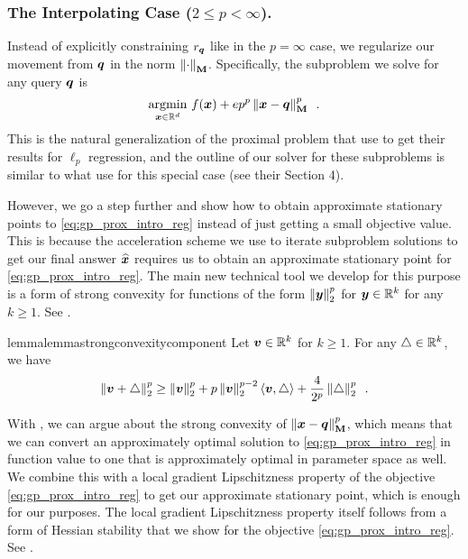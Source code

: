 \subsubsection{The Interpolating Case (\texorpdfstring{$2 \le p < \infty$}{2 <= p < infinity}).}

Instead of explicitly constraining $r_{\bm{q}}$ like in the $p=\infty$ case, we regularize our movement from $\bm{q}$ in the norm $\left\lVert \cdot \right\rVert_{\mathbf{M}}$. Specifically, the subproblem we solve for any query $\bm{q}$ is
\begin{align}
    \underset{\bm{x}\in\mathbb{R}^d}{\mathrm{argmin}}\  f(\bm{x}) + ep^p\left\lVert \bm{x}-\bm{q} \right\rVert_{\mathbf{M}}^p\enspace.\label{eq:gp_prox_intro_reg}
\end{align}
This is the natural generalization of the proximal problem that \cite{jls21} use to get their results for $\ell_p$ regression, and the outline of our solver for these subproblems is similar to what \cite{jls21} use for this special case (see their Section 4).

However, we go a step further and show how to obtain approximate stationary points to \eqref{eq:gp_prox_intro_reg} instead of just getting a small objective value. This is because the acceleration scheme we use to iterate subproblem solutions to get our final answer $\widehat{\bm{x}}$ requires us to obtain an approximate stationary point for \eqref{eq:gp_prox_intro_reg}. The main new technical tool we develop for this purpose is a form of strong convexity for functions of the form $\left\lVert \bm{y} \right\rVert_2^p$ for $\bm{y}\in\mathbb{R}^k$ for any $k\ge 1$. See .

\begin{restatable*}{lemma}{lemmastrongconvexitycomponent}
\label{lemma:strong_convexity_component}
Let $\bm{v} \in \mathbb{R}^k$ for $k\ge 1$. For any $\triangle \in \mathbb{R}^k$, we have
\begin{align*}
    \left\lVert \bm{v}+\triangle \right\rVert_2^p \ge \left\lVert \bm{v} \right\rVert_2^p + p\left\lVert \bm{v} \right\rVert_2^{p-2}\left\langle \bm{v},\triangle \right\rangle+\frac{4}{2^p}\left\lVert \triangle \right\rVert_2^p\enspace.
\end{align*}
\end{restatable*}

With , we can argue about the strong convexity of $\left\lVert \bm{x}-\bm{q} \right\rVert_{\mathbf{M}}^p$, which means that we can convert an approximately optimal solution to \eqref{eq:gp_prox_intro_reg} in function value to one that is approximately optimal in parameter space as well. We combine this with a local gradient Lipschitzness property of the objective \eqref{eq:gp_prox_intro_reg} to get our approximate stationary point, which is enough for our purposes. The local gradient Lipschitzness property itself follows from a form of Hessian stability that we show for the objective \eqref{eq:gp_prox_intro_reg}. See .

